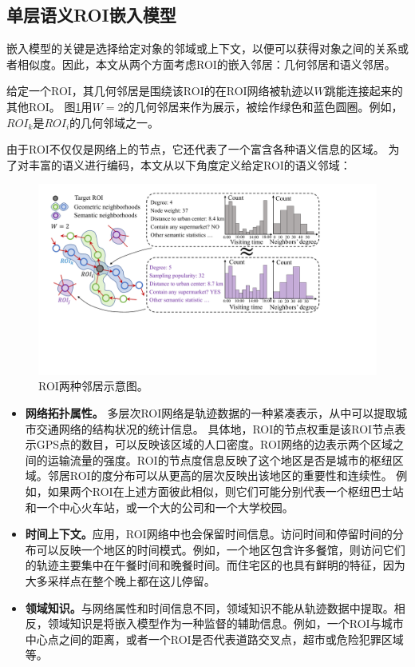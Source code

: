 \subsection{单层语义ROI嵌入模型}
嵌入模型的关键是选择给定对象的邻域或上下文，以便可以获得对象之间的关系或者相似度。因此，本文从两个方面考虑ROI的嵌入邻居：几何邻居和语义邻居。

给定一个ROI，其几何邻居是围绕该ROI的在ROI网络被轨迹以$W$跳能连接起来的其他ROI。 图\ref{fig:context}用$W =2$的几何邻居来作为展示，被绘作绿色和蓝色圆圈。例如，${ROI}_k $是$ {ROI} _i $的几何邻域之一。

由于ROI不仅仅是网络上的节点，它还代表了一个富含各种语义信息的区域。 为了对丰富的语义进行编码，本文从以下角度定义给定ROI的语义邻域：

\tabcolsep=1pt
\begin{figure}[!t]
\centering
\includegraphics[width=130mm]{pics/embedding.pdf}
\caption {ROI两种邻居示意图。}
\label{fig:context}
\end{figure}

\begin{itemize}
\item \textbf{网络拓扑属性。} 多层次ROI网络是轨迹数据的一种紧凑表示，从中可以提取城市交通网络的结构状况的统计信息。 具体地，ROI的节点权重是该ROI节点表示GPS点的数目，可以反映该区域的人口密度。ROI网络的边表示两个区域之间的运输流量的强度。ROI的节点度信息反映了这个地区是否是城市的枢纽区域。邻居ROI的度分布可以从更高的层次反映出该地区的重要性和连续性。 例如，如果两个ROI在上述方面彼此相似，则它们可能分别代表一个枢纽巴士站和一个中心火车站，或一个大的公司和一个大学校园。

\item \textbf{时间上下文。}应用，ROI网络中也会保留时间信息。访问时间和停留时间的分布可以反映一个地区的时间模式。例如，一个地区包含许多餐馆，则访问它们的轨迹主要集中在午餐时间和晚餐时间。而住宅区的也具有鲜明的特征，因为大多采样点在整个晚上都在这儿停留。

\item \textbf{领域知识。}与网络属性和时间信息不同，领域知识不能从轨迹数据中提取。相反，领域知识是将嵌入模型作为一种监督的辅助信息。例如，一个ROI与城市中心点之间的距离，或者一个ROI是否代表道路交叉点，超市或危险犯罪区域等。
\end{itemize}




